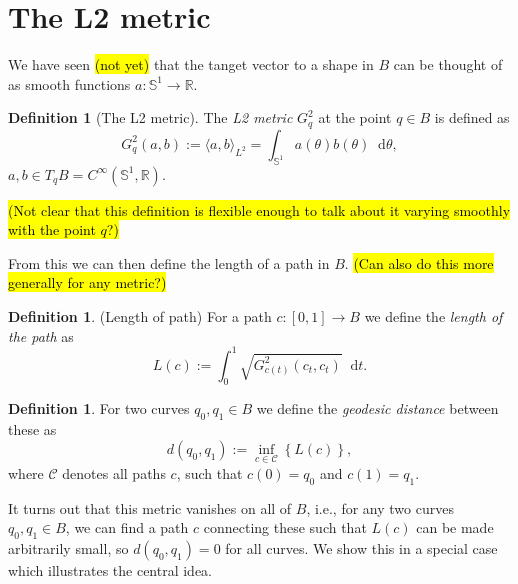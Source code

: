 \documentclass[a4,danish]{article}
\theoremstyle{break}
\theoremstyle{definition}
\newtheorem{definition}[subsection]{Definition}
\theoremstyle{Break}
\newcommand{\R}{\mathbb{R}}
\renewcommand{\S}{\mathbb{S}}
\newcommand*\diff{\mathop{}\!\mathrm{d}}
\begin{document}

\section*{The L2 metric}
\label{sec:l2-metric}

We have seen \hl{(not yet)} that the tanget vector to a shape in $B$
can be thought of as smooth functions $a\colon\S^1 \rightarrow \R$.

\begin{definition}[The L2 metric]
  The \textit{L2 metric} $G^2_q$ at the point $q\in B$ is defined as
  \begin{equation*}
    G^2_q(a,b) := \langle a, b \rangle_{L^2} = \int_{\S^{1}} a(\theta)
    b(\theta) \diff \theta,
  \end{equation*}
  $a,b \in T_qB = C^{\infty}(\S^1,\R)$.
\end{definition}

\hl{(Not clear that this definition is flexible enough to talk about
  it varying smoothly with the point $q$?)}

From this we can then define the length of a path in $B$. \hl{(Can
  also do this more generally for any metric?)}

\begin{definition}(Length of path)
  For a path $c: [0,1] \rightarrow B$ we define the \textit{length of the path}
  as
  \begin{equation*}
    L(c) := \int_{0}^{1} \sqrt{G_{c(t)}^2(c_t,c_t)} \diff t.
  \end{equation*}
\end{definition}

\begin{definition}
  For two curves $q_0, q_1 \in B$ we define the \textit{geodesic
    distance} between these as
  \begin{equation*}
    d(q_0,q_1) := \inf_{c\in\mathcal{C}}
    \left\{
      L(c)
\right\},
  \end{equation*}
  where $\mathcal{C}$ denotes all paths $c$, such that $c(0) =q_0$ and $c(1) =q_1$.
\end{definition}

It turns out that this metric vanishes on all of $B$, i.e., for any
two curves $q_0,q_1 \in B$,  we can find a path $c$ connecting these
such that $L(c)$ can be made arbitrarily small, so $d(q_0, q_1)=0$ for
all curves. We show this in
a special case which illustrates the central idea.
\end{document}
